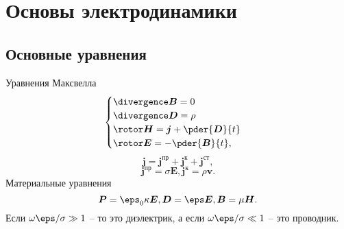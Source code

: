 \documentclass[a4paper, oneside, 12pt]{book}
\renewcommand{\vec}[1]{\boldsymbol{#1}}
\begin{document}
\part{Основы электродинамики}
\chapter{Основные уравнения}
  Уравнения Максвелла
  \[
  \begin{cases}
    \divergence \vec{B} = 0\\
    \divergence\vec{D} = \rho\\
    \rotor\vec{H} = \vec{j} + \pder{\vec{D}}{t}\\
    \rotor\vec{E} = -\pder{\vec{B}}{t},
  \end{cases}
  \]
  \[
    \vec{j} = \vec{j}^\text{пр} + \vec{j}^\text{к} + \vec{j}^\text{ст},
  \]
  \[
    \vec{j}^\text{пр} = \sigma\vec{E}, \vec{j}^\text{к} = \rho\vec{v}.
  \]
  Материальные уравнения
  \[
    \vec{P} = \eps_0\kappa\vec{E}, \vec{D} = \eps\vec{E}, \vec{B} = \mu\vec{H}.
  \]
  Если \(\omega\eps/\sigma \gg 1\) -- то это диэлектрик, а если \(\omega\eps/\sigma \ll 1\) -- это проводник.
\end{document}
